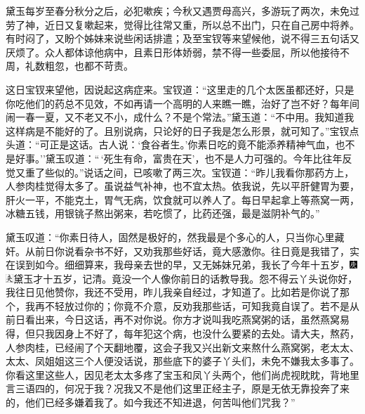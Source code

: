 黛玉每岁至春分秋分之后，必犯嗽疾；今秋又遇贾母高兴，多游玩了两次，未免过劳了神，近日又复嗽起来，觉得比往常又重，所以总不出门，只在自己房中将养。有时闷了，又盼个姊妹来说些闲话排遣；及至宝钗等来望候他，说不得三五句话又厌烦了。众人都体谅他病中，且素日形体娇弱，禁不得一些委屈，所以他接待不周，礼数粗忽，也都不苛责。

这日宝钗来望他，因说起这病症来。宝钗道：``这里走的几个太医虽都还好，只是你吃他们的药总不见效，不如再请一个高明的人来瞧一瞧，治好了岂不好？每年间闹一春一夏，又不老又不小，成什么？不是个常法。''黛玉道：``不中用。我知道我这样病是不能好的了。且别说病，只论好的日子我是怎么形景，就可知了。''宝钗点头道：``可正是这话。古人说：`食谷者生。'你素日吃的竟不能添养精神气血，也不是好事。''黛玉叹道：``\,`死生有命，富贵在天'，也不是人力可强的。今年比往年反觉又重了些似的。''说话之间，已咳嗽了两三次。宝钗道：``昨儿我看你那药方上，人参肉桂觉得太多了。虽说益气补神，也不宜太热。依我说，先以平肝健胃为要，肝火一平，不能克土，胃气无病，饮食就可以养人了。每日早起拿上等燕窝一两，冰糖五钱，用银铫子熬出粥来，若吃惯了，比药还强，最是滋阴补气的。''

黛玉叹道：``你素日待人，固然是极好的，然我最是个多心的人，只当你心里藏奸。从前日你说看杂书不好，又劝我那些好话，竟大感激你。往日竟是我错了，实在误到如今。细细算来，我母亲去世的早，又无姊妹兄弟，我长了今年十五岁，{\includegraphics[width=3mm]{../Images/00004}\includegraphics[width=3mm]{../Images/00012}\footnotesize \kaishu 黛玉才十五岁，记清。}竟没一个人像你前日的话教导我。怨不得云丫头说你好，我往日见他赞你，我还不受用，昨儿我亲自经过，才知道了。比如若是你说了那个，我再不轻放过你的；你竟不介意，反劝我那些话，可知我竟自误了。若不是从前日看出来，今日这话，再不对你说。你方才说叫我吃燕窝粥的话，虽然燕窝易得，但只我因身上不好了，每年犯这个病，也没什么要紧的去处。请大夫，熬药，人参肉桂，已经闹了个天翻地覆，这会子我又兴出新文来熬什么燕窝粥，老太太、太太、凤姐姐这三个人便没话说，那些底下的婆子丫头们，未免不嫌我太多事了。你看这里这些人，因见老太太多疼了宝玉和凤丫头两个，他们尚虎视眈眈，背地里言三语四的，何况于我？况我又不是他们这里正经主子，原是无依无靠投奔了来的，他们已经多嫌着我了。如今我还不知进退，何苦叫他们咒我？''

